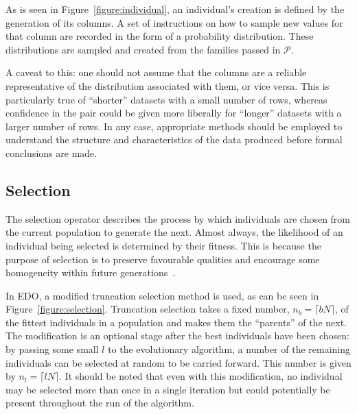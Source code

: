 As is seen in Figure~\ref{figure:individual}, an individual's creation
is defined by the generation of its columns. A set of instructions on how to
sample new values for that column are recorded in the form of a probability
distribution. These distributions are sampled and created from the families
passed in \(\mathcal{P}\).


A caveat to this: one should not assume that the columns are a reliable
representative of the distribution associated with them, or vice versa. This is
particularly true of ``shorter'' datasets with a small number of rows, whereas
confidence in the pair could be given more liberally for ``longer'' datasets
with a larger number of rows. In any case, appropriate methods should be
employed to understand the structure and characteristics of the data produced
before formal conclusions are made.



\subsection{Selection}

The selection operator describes the process by which individuals are chosen
from the current population to generate the next. Almost always, the likelihood
of an individual being selected is determined by their fitness. This is because
the purpose of selection is to preserve favourable qualities and encourage some
homogeneity within future generations~\cite{Back1994}.



In EDO, a modified truncation selection method is used, as can be seen in
Figure~\ref{figure:selection}. Truncation selection takes a fixed number, \(n_b
= \lceil bN\rceil\), of the fittest individuals in a population and makes them
the ``parents'' of the next. The modification is an optional stage after the
best individuals have been chosen: by passing some small \(l\) to the
evolutionary algorithm, a number of the remaining individuals can be selected at
random to be carried forward. This number is given by \(n_l = \lceil lN
\rceil\). It should be noted that even with this modification, no individual may
be selected more than once in a single iteration but could potentially be
present throughout the run of the algorithm.

